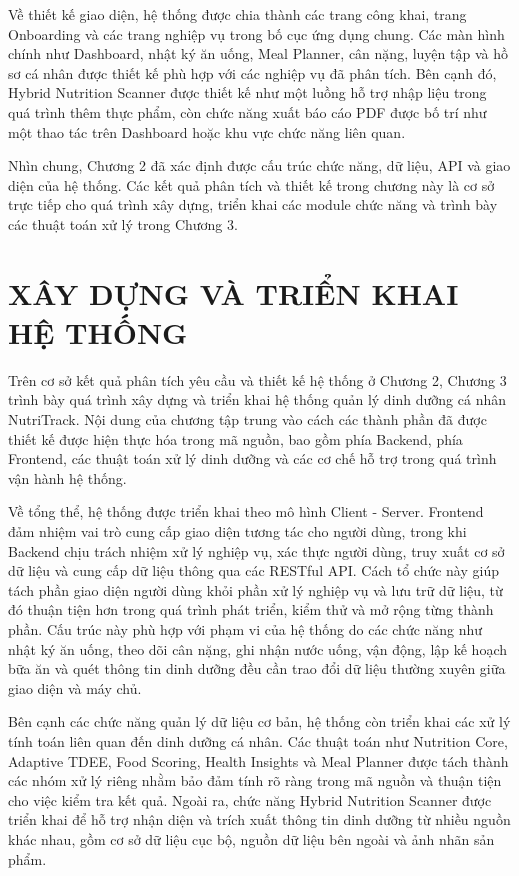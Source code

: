 \documentclass[12pt, a4paper]{report}
\begin{document}
Về thiết kế giao diện, hệ thống được chia thành các trang công khai, trang Onboarding và các trang nghiệp vụ trong bố cục ứng dụng chung. Các màn hình chính như Dashboard, nhật ký ăn uống, Meal Planner, cân nặng, luyện tập và hồ sơ cá nhân được thiết kế phù hợp với các nghiệp vụ đã phân tích. Bên cạnh đó, Hybrid Nutrition Scanner được thiết kế như một luồng hỗ trợ nhập liệu trong quá trình thêm thực phẩm, còn chức năng xuất báo cáo PDF được bố trí như một thao tác trên Dashboard hoặc khu vực chức năng liên quan.

Nhìn chung, Chương 2 đã xác định được cấu trúc chức năng, dữ liệu, API và giao diện của hệ thống. Các kết quả phân tích và thiết kế trong chương này là cơ sở trực tiếp cho quá trình xây dựng, triển khai các module chức năng và trình bày các thuật toán xử lý trong Chương 3.


\chapter{XÂY DỰNG VÀ TRIỂN KHAI HỆ THỐNG}
Trên cơ sở kết quả phân tích yêu cầu và thiết kế hệ thống ở Chương 2, Chương 3 trình bày quá trình xây dựng và triển khai hệ thống quản lý dinh dưỡng cá nhân NutriTrack. Nội dung của chương tập trung vào cách các thành phần đã được thiết kế được hiện thực hóa trong mã nguồn, bao gồm phía Backend, phía Frontend, các thuật toán xử lý dinh dưỡng và các cơ chế hỗ trợ trong quá trình vận hành hệ thống.

Về tổng thể, hệ thống được triển khai theo mô hình Client - Server. Frontend đảm nhiệm vai trò cung cấp giao diện tương tác cho người dùng, trong khi Backend chịu trách nhiệm xử lý nghiệp vụ, xác thực người dùng, truy xuất cơ sở dữ liệu và cung cấp dữ liệu thông qua các RESTful API. Cách tổ chức này giúp tách phần giao diện người dùng khỏi phần xử lý nghiệp vụ và lưu trữ dữ liệu, từ đó thuận tiện hơn trong quá trình phát triển, kiểm thử và mở rộng từng thành phần. Cấu trúc này phù hợp với phạm vi của hệ thống do các chức năng như nhật ký ăn uống, theo dõi cân nặng, ghi nhận nước uống, vận động, lập kế hoạch bữa ăn và quét thông tin dinh dưỡng đều cần trao đổi dữ liệu thường xuyên giữa giao diện và máy chủ.

Bên cạnh các chức năng quản lý dữ liệu cơ bản, hệ thống còn triển khai các xử lý tính toán liên quan đến dinh dưỡng cá nhân. Các thuật toán như Nutrition Core, Adaptive TDEE, Food Scoring, Health Insights và Meal Planner được tách thành các nhóm xử lý riêng nhằm bảo đảm tính rõ ràng trong mã nguồn và thuận tiện cho việc kiểm tra kết quả. Ngoài ra, chức năng Hybrid Nutrition Scanner được triển khai để hỗ trợ nhận diện và trích xuất thông tin dinh dưỡng từ nhiều nguồn khác nhau, gồm cơ sở dữ liệu cục bộ, nguồn dữ liệu bên ngoài và ảnh nhãn sản phẩm.
\end{document}
